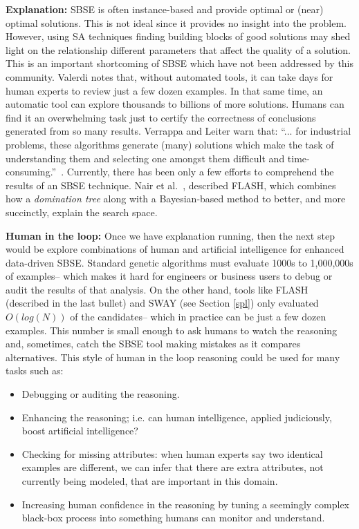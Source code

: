 \documentclass[sigconf,anonymous,review]{acmart}
\begin{document}
  \noindent\textbf{Explanation: } SBSE is often instance-based and provide optimal or (near) optimal solutions. This is not ideal since it provides no insight into the problem. However, using SA techniques finding
building blocks of good solutions may shed light on the relationship
different parameters that affect the quality of a solution. This is an important shortcoming of SBSE which have not been addressed by this community. Valerdi
notes that, without automated tools, it can take days for human
experts to review just a few dozen examples. In that same
time, an automatic tool can explore thousands to billions of more
solutions. Humans can find it an overwhelming task just to
certify the correctness of conclusions generated from so many
results. Verrappa and Leiter warn that:
``... for industrial problems, these algorithms generate
(many) solutions which make the task of understanding
them and selecting one amongst them difficult
and time-consuming.''~\cite{veerappa2011understanding}. Currently, there has been only a few efforts to comprehend the results of an SBSE technique. Nair et al.~\cite{nair2017flash}, described FLASH, which
combines   how a \textit{domination tree} along with a Bayesian-based method to better, and more succinctly,
explain the search space. 

 \noindent\textbf{Human in the loop: } Once we have explanation running, then the next step would be explore
combinations of human and artificial intelligence for
enhanced data-driven SBSE.
Standard
genetic algorithms must evaluate 1000s to 1,000,000s of examples-- which makes it hard for engineers or business users to debug or audit the results of that analysis. On the 
other hand, tools like FLASH (described in the last bullet)
and SWAY (see Section \ref{spl}) only evaluated $O(log(N))$ of the candidates-- which in practice can be just a few dozen examples. This number is small enough to ask humans
to watch the reasoning and, sometimes, catch the SBSE
tool making mistakes as it compares alternatives.  This style of human in the loop reasoning could be used for many tasks such as:
\begin{itemize}[leftmargin=*]
\item Debugging or auditing the reasoning.
\item Enhancing the reasoning; i.e. can human intelligence, applied judiciously,  boost artificial intelligence?
\item Checking for missing attributes: when human experts say two identical examples are different, we can infer that there are extra attributes, not currently being modeled, that are important in this domain.
\item Increasing human  confidence in the reasoning by tuning a seemingly complex black-box process into something
humans can monitor and understand.
\end{itemize}
\end{document}
